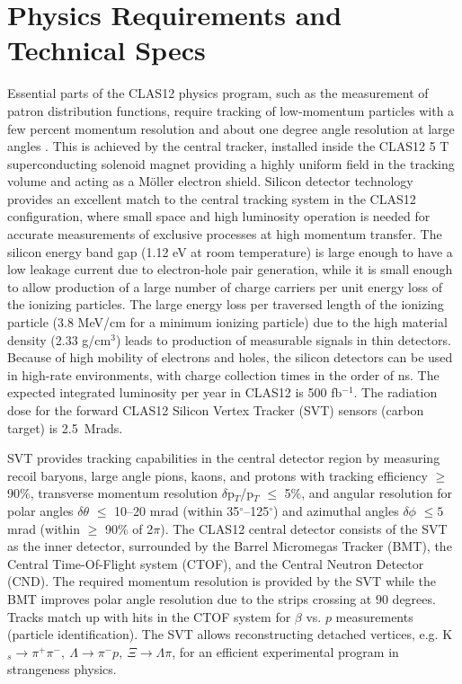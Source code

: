 \section{Physics Requirements and Technical Specs}
Essential parts of the CLAS12 physics program, such as the measurement of patron distribution functions, require tracking of low-momentum  particles with a few percent momentum resolution and about one degree angle resolution at large angles \cite{TDR12}. This is achieved by the central tracker, installed inside the CLAS12 5 T superconducting solenoid magnet providing a highly uniform field in the tracking volume and acting as a M\"oller electron shield. Silicon detector technology provides an excellent match to the central tracking system in the CLAS12 configuration, where small space and high luminosity operation is needed for accurate measurements of exclusive processes at high momentum transfer. The silicon energy band gap (1.12 eV at room temperature) is large enough to have a low leakage current due to electron-hole pair generation, while it is small enough to allow production of a large number of charge carriers per unit energy loss of the ionizing particles. The large energy loss per traversed length of the ionizing particle (3.8 MeV/cm for a minimum ionizing particle) due to the high material density (2.33 g/cm$^3$) leads to production of  measurable signals in thin detectors. Because of high mobility of electrons and holes, the silicon detectors can be used in high-rate environments, with charge collection times in the order of ns. The expected integrated luminosity per year in CLAS12 is 500 fb$^{-1}$. The radiation dose for the forward CLAS12 Silicon Vertex Tracker (SVT) sensors (carbon target) is 2.5~Mrads.

SVT provides tracking capabilities in the central detector region by measuring recoil baryons, large angle pions,  kaons, and protons with tracking efficiency $\ge$ 90$\%$, transverse momentum resolution $\delta$p$_{T}$/p$_{T}$ $\le$ 5$\%$, and angular resolution for polar angles $\delta$$\theta$ $\le$ 10--20 mrad (within 35$^\circ$--125$^\circ$) and azimuthal angles $\delta$$\phi$ $\le5$ mrad (within $\ge$ 90$\%$ of 2$\pi$). The CLAS12 central detector consists of the SVT as the inner detector, surrounded by the Barrel Micromegas Tracker (BMT), the Central Time-Of-Flight system (CTOF), and the Central Neutron Detector (CND). The required momentum resolution is provided by the SVT while the BMT improves polar angle resolution due to the strips crossing at $ 90$ degrees. Tracks match up with hits in the CTOF system for $\beta$ vs. $p$ measurements (particle identification). The SVT allows reconstructing detached vertices, e.g. K$_{s}\!\to\!\pi^{+}\pi^{-},~\Lambda\!\to\!\pi^{-}p,~\Xi\!\to\!\Lambda\pi$, for an efficient experimental program in strangeness physics.  

